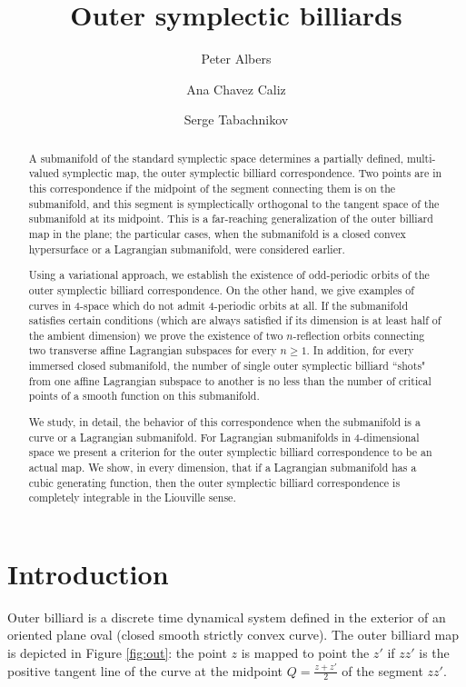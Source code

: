 \documentclass[12pt]{article}
\title{Outer symplectic billiards}
\author{Peter Albers
 \and 
Ana Chavez Caliz
\and
Serge Tabachnikov
}
\date{}
\begin{document}
\maketitle
\begin{abstract}
A submanifold of the standard symplectic space determines a partially defined, multi-valued symplectic map, the outer symplectic billiard correspondence. Two points are in this correspondence if the midpoint of the segment connecting them is on the submanifold, and this segment is symplectically orthogonal to the tangent space of the submanifold at its midpoint. This is a far-reaching generalization of the outer billiard map in the plane; the particular cases, when the submanifold is a closed convex hypersurface or a Lagrangian submanifold, were considered earlier. 

Using a variational approach, we establish the existence of odd-periodic orbits of the outer symplectic billiard correspondence. On the other hand, we give examples of curves in 4-space which do not admit 4-periodic orbits at all. If the submanifold satisfies certain conditions (which are always satisfied if its dimension is at least half of the ambient dimension) we prove the existence of two $n$-reflection orbits connecting two transverse affine Lagrangian subspaces for every $n\geq1$. In addition, for every immersed closed submanifold, the number of single outer symplectic billiard ``shots" from one affine Lagrangian subspace to another is no less than the number of critical points of a smooth function on this submanifold. 

We study, in detail, the behavior of this correspondence when the submanifold is a curve or a Lagrangian submanifold. For Lagrangian submanifolds in 4-dimensional space we present a criterion for the outer symplectic billiard correspondence to be an actual map. We show, in every dimension, that if a Lagrangian submanifold has a cubic generating function, then the outer symplectic billiard correspondence is completely integrable in the Liouville sense.
\end{abstract}

\tableofcontents

\section{Introduction} \label{sect:intro}

Outer billiard is a discrete time dynamical system defined in the exterior of an oriented plane oval (closed smooth strictly convex curve). The outer billiard map is depicted in Figure \ref{fig:out}: the point $z$ is mapped to point the $z'$ if $zz'$ is the positive tangent line of the curve at the midpoint $Q=\frac{z+z'}{2}$ of the segment $zz'$.
\end{document}
